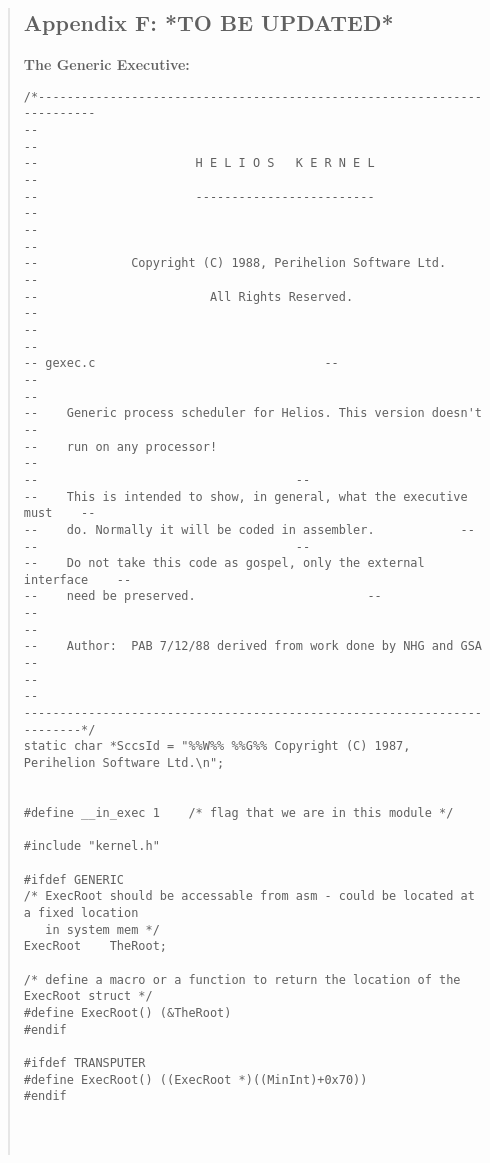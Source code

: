 \begin {quote}
\subsection*{Appendix F: *TO BE UPDATED*}

{\bf The Generic Executive:}

\scriptsize
\begin{verbatim}
/*------------------------------------------------------------------------
--                                                                      --
--                      H E L I O S   K E R N E L                       --
--                      -------------------------                       --
--                                                                      --
--             Copyright (C) 1988, Perihelion Software Ltd.             --
--                        All Rights Reserved.                          --
--                                                                      --
-- gexec.c                                --
--                                                                      --
--    Generic process scheduler for Helios. This version doesn't      --
--    run on any processor!                                           --
--                                    --
--    This is intended to show, in general, what the executive must    --
--    do. Normally it will be coded in assembler.            --
--                                    --
--    Do not take this code as gospel, only the external interface    --
--    need be preserved.                        --
--                                                                      --
--    Author:  PAB 7/12/88 derived from work done by NHG and GSA    --
--                                                                      --
------------------------------------------------------------------------*/
static char *SccsId = "%%W%% %%G%% Copyright (C) 1987, Perihelion Software Ltd.\n";


#define __in_exec 1    /* flag that we are in this module */

#include "kernel.h"

#ifdef GENERIC
/* ExecRoot should be accessable from asm - could be located at a fixed location
   in system mem */
ExecRoot    TheRoot;

/* define a macro or a function to return the location of the ExecRoot struct */
#define ExecRoot() (&TheRoot)
#endif

#ifdef TRANSPUTER
#define ExecRoot() ((ExecRoot *)((MinInt)+0x70))
#endif




\end{verbatim}
\end{quote}
